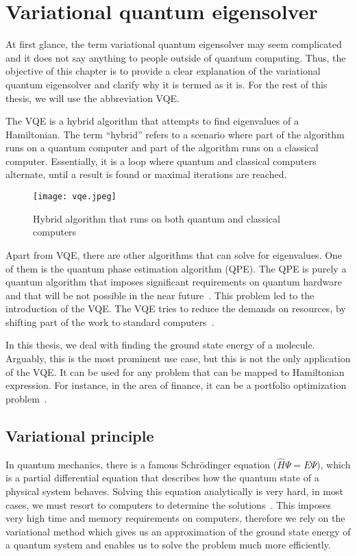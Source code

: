 \chapter{Variational quantum eigensolver}\label{ch:vqe}
At first glance, the term variational quantum eigensolver may seem complicated and it does not say anything to people outside of quantum computing. Thus, the objective of this chapter is to provide a clear explanation of the variational quantum eigensolver and clarify why it is termed as it is. For the rest of this thesis, we will use the abbreviation VQE.

The VQE is a hybrid algorithm that attempts to find eigenvalues of a Hamiltonian. The term ``hybrid'' refers to a scenario where part of the algorithm runs on a quantum computer and part of the algorithm runs on a classical computer. Essentially, it is a loop where quantum and classical computers alternate, until a result is found or maximal iterations are reached.

\begin{figure}[H]
    \centering
    \texttt{[image: vqe.jpeg]}
    \caption{Hybrid algorithm that runs on both quantum and classical computers~\cite{hybrid_alg}}
\end{figure}

Apart from VQE, there are other algorithms that can solve for eigenvalues. One of them is the quantum phase estimation algorithm (QPE). The QPE is purely a quantum algorithm that imposes significant requirements on quantum hardware and that will be not possible in the near future~\cite{nisq}. This problem led to the introduction of the VQE. The VQE tries to reduce the demands on resources, by shifting part of the work to standard computers~\cite{vqe_method}.

In this thesis, we deal with finding the ground state energy of a molecule. Arguably, this is the most prominent use case, but this is not the only application of the VQE. It can be used for any problem that can be mapped to Hamiltonian expression. For instance, in the area of finance, it can be a portfolio optimization problem~\cite{portfolio}.

\section{Variational principle}
In quantum mechanics, there is a famous Schrödinger equation ($\hat{H} \Psi = E \Psi$), which is a partial differential equation that describes how the quantum state of a physical system behaves. Solving this equation analytically is very hard, in most cases, we must resort to computers to determine the solutions~\cite{variational}. This imposes very high time and memory requirements on computers, therefore we rely on the variational method which gives us an approximation of the ground state energy of a quantum system and enables us to solve the problem much more efficiently.

